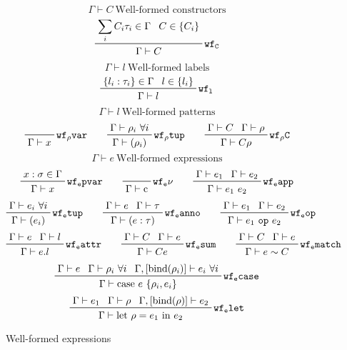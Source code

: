 \documentclass[letterpaper]{article}
\begin{document}
\begin{figure}
  $$ \boxed{\Gamma\vdash C}\ \textrm{Well-formed constructors} $$
  $$ \prftree[r]{$\mathtt{wf_C}$}
             {\prfassumption{\sum_i C_i\tau_i\in\Gamma}}{\prfassumption{C\in\{C_i\}}}
             {\Gamma\vdash C} $$
  $$ \boxed{\Gamma\vdash l}\ \textrm{Well-formed labels} $$
  $$ \prftree[r]{$\mathtt{wf_l}$}
             {\prfassumption{\{l_i:\tau_i\}\in\Gamma}}{\prfassumption{l\in\{l_i\}}}
             {\Gamma\vdash l} $$
  $$ \boxed{\Gamma\vdash l}\ \textrm{Well-formed patterns} $$
  $$ \prfbyaxiom{$\mathtt{wf_\rho var}$}
             {\Gamma\vdash x}\qquad
     \prftree[r]{$\mathtt{wf_\rho tup}$}
             {\prfassumption{\Gamma\vdash\rho_i\ \forall i}}
             {\Gamma\vdash (\rho_i)}\qquad
     \prftree[r]{$\mathtt{wf_\rho C}$}
             {\prfassumption{\Gamma\vdash C}}{\prfassumption{\Gamma\vdash\rho}}
             {\Gamma\vdash C\rho} $$
  $$ \boxed{\Gamma\vdash e}\ \textrm{Well-formed expressions} $$
  $$ \prftree[r]{$\mathtt{wf_e pvar}$}
             {\prfassumption{x:\sigma\in\Gamma}}
             {\Gamma\vdash x}\qquad
     \prfbyaxiom{$\mathtt{wf_e \nu}$}
             {\Gamma\vdash \mathrm{c}}\qquad
     \prftree[r]{$\mathtt{wf_e app}$}
             {\prfassumption{\Gamma\vdash e_1}}{\prfassumption{\Gamma\vdash e_2}}
             {\Gamma\vdash e_1\ e_2} $$
  $$ \prftree[r]{$\mathtt{wf_e tup}$}
             {\prfassumption{\Gamma\vdash e_i\ \forall i}}
             {\Gamma\vdash (e_i)}\qquad
     \prftree[r]{$\mathtt{wf_e anno}$}
             {\prfassumption{\Gamma\vdash e}}{\prfassumption{\Gamma\vdash\tau}}
             {\Gamma\vdash (e : \tau)}\qquad
     \prftree[r]{$\mathtt{wf_e op}$}
             {\prfassumption{\Gamma\vdash e_1}}{\prfassumption{\Gamma\vdash e_2}}
             {\Gamma\vdash e_1\ \texttt{op}\ e_2} $$
  $$ \prftree[r]{$\mathtt{wf_e attr}$}
             {\prfassumption{\Gamma\vdash e}}{\prfassumption{\Gamma\vdash l}}
             {\Gamma\vdash e.l}\qquad
     \prftree[r]{$\mathtt{wf_e sum}$}
             {\prfassumption{\Gamma\vdash C}}{\prfassumption{\Gamma\vdash e}}
             {\Gamma\vdash C e}\qquad
     \prftree[r]{$\mathtt{wf_e match}$}
             {\prfassumption{\Gamma\vdash C}}{\prfassumption{\Gamma\vdash e}}
             {\Gamma\vdash e \sim C} $$
  $$ \prftree[r]{$\mathtt{wf_e case}$}
             {\prfassumption{\Gamma\vdash e}}{\prfassumption{\Gamma\vdash\rho_i\ \forall i}}
             {\prfassumption{\Gamma,[\mathrm{bind}(\rho_i)]\vdash e_i\ \forall i}}
             {\Gamma\vdash\textrm{case}\ e\ \{\rho_i, e_i\}} $$
  $$ \prftree[r]{$\mathtt{wf_e let}$}
             {\prfassumption{\Gamma\vdash e_1}}{\prfassumption{\Gamma\vdash\rho}}
             {\prfassumption{\Gamma,[\mathrm{bind}(\rho)]\vdash e_2}}
             {\Gamma\vdash\textrm{let}\ \rho=e_1\ \textrm{in}\ e_2} $$
  \caption{Well-formed expressions}
  \label{f:wf:expressions}
\end{figure}
\end{document}
